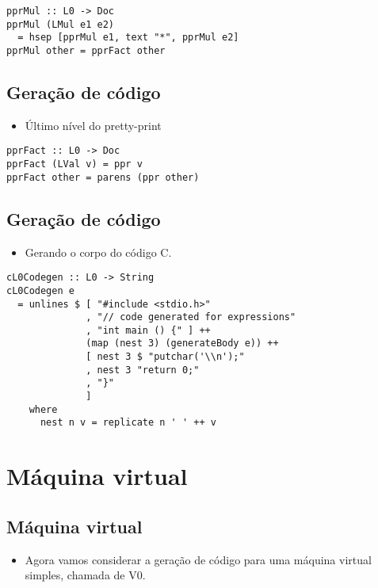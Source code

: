 \documentclass[11pt]{article}
\begin{document}
\begin{verbatim}
pprMul :: L0 -> Doc 
pprMul (LMul e1 e2) 
  = hsep [pprMul e1, text "*", pprMul e2]
pprMul other = pprFact other 
\end{verbatim}
\subsection*{Geração de código}
\label{sec:org92535bd}

\begin{itemize}
\item Último nível do pretty-print
\end{itemize}

\begin{verbatim}
pprFact :: L0 -> Doc
pprFact (LVal v) = ppr v 
pprFact other = parens (ppr other)
\end{verbatim}
\subsection*{Geração de código}
\label{sec:orgef9d555}

\begin{itemize}
\item Gerando o corpo do código C.
\end{itemize}

\begin{verbatim}
cL0Codegen :: L0 -> String 
cL0Codegen e 
  = unlines $ [ "#include <stdio.h>"
              , "// code generated for expressions"
              , "int main () {" ] ++
              (map (nest 3) (generateBody e)) ++
              [ nest 3 $ "putchar('\\n');"
              , nest 3 "return 0;"
              , "}"
              ] 
    where
      nest n v = replicate n ' ' ++ v
\end{verbatim}
\section*{Máquina virtual}
\label{sec:orgc178b21}

\subsection*{Máquina virtual}
\label{sec:org46b47c9}

\begin{itemize}
\item Agora vamos considerar a geração de código para uma máquina virtual simples, chamada de V0.
\end{itemize}
\end{document}
